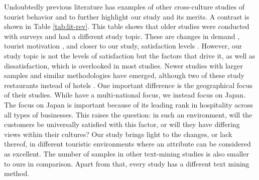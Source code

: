 \documentclass[smallextended,natbib]{svjour3}       %
\begin{document}
    Undoubtedly previous literature has examples of other cross-culture studies of tourist behavior and to further highlight our study and its merits. A contrast is shown in Table \ref{tab:lit-rev}. This table shows that older studies were conducted with surveys and had a different study topic. These are changes in demand \cite{bauer1993changing}, tourist motivation \cite{kim2000}, and closer to our study, satisfaction levels \cite{choi2000}. However, our study topic is not the levels of satisfaction but the factors that drive it, as well as dissatisfaction, which is overlooked in most studies. Newer studies with larger samples and similar methodologies have emerged, although two of these study restaurants instead of hotels \cite{JIA2020104071, HUANG2017117}. One important difference is the geographical focus of their studies. While \cite{FRANCESCO201924, JIA2020104071, HUANG2017117} have a multi-national focus, we instead focus on Japan. The focus on Japan is important because of its leading rank in hospitality across all types of businesses. This raises the question: in such an environment, will the customers be universally satisfied with this factor, or will they have differing views within their cultures? Our study brings light to the changes, or lack thereof, in different touristic environments where an attribute can be considered as excellent. The number of samples in other text-mining studies is also smaller to ours in comparison. Apart from that, every study has a different text mining method.
\end{document}
